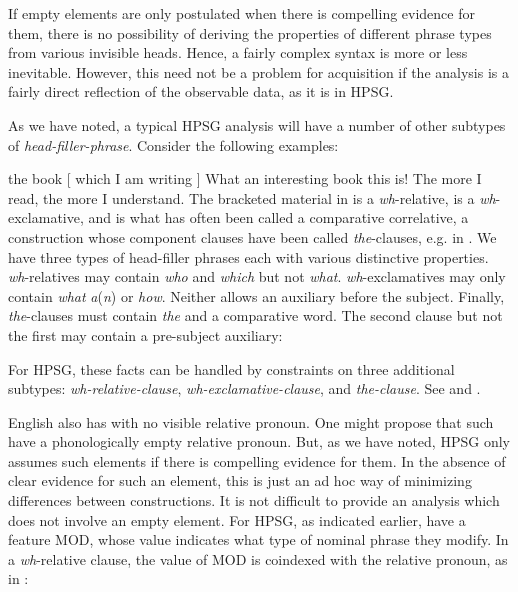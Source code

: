 \documentclass[output=paper]{langsci/langscibook}
\begin{document}
If empty elements are only postulated when there is compelling evidence for
them, there is no possibility of deriving the properties of different phrase
types from various invisible heads. Hence, a fairly complex syntax is more or
less inevitable. However, this need not be a problem for acquisition if the
analysis is a fairly direct reflection of the observable data, as it is in
\gls{HPSG}.

As we have noted, a typical \gls{HPSG} analysis will have a number of other
subtypes of \emph{head-filler-phrase}. Consider the following examples:

\ea\label{ex:key:4.9}
    the book [ which I am writing ]
\z
\ea\label{ex:key:4.10}
    What an interesting book this is!
\z
\ea\label{ex:key:4.11}
    The more I read, the more I understand.
\z
%
The bracketed material in  is a \emph{wh}-relative,
 is a \emph{wh}-exclamative, and  is what has
often been called a comparative correlative, a construction whose component
clauses have been called \emph{the}{}-clauses, e.g. in \citet{Borsley2011}. We
have three types of head-filler phrases each with various distinctive
properties. \emph{wh}-relatives may contain \emph{who} and \emph{which} but not
\emph{what}. \emph{wh}-exclamatives may only contain \emph{what}
\emph{a}(\emph{n}) or \emph{how}. Neither allows an auxiliary before the
subject. Finally, \emph{the}{}-clauses must contain \emph{the} and a
comparative word. The second clause but not the first may contain a pre-subject
auxiliary:

\ea\label{ex:key:4.12}
    \z
\z
%
For \gls{HPSG}, these facts can be handled by constraints on three additional
subtypes: \emph{wh-relative-clause}, \emph{wh-exclamative-clause}, and
\emph{the-clause}. See \citet{GinSag2000} and \citet{Sag2010}.

English also has  with no visible relative pronoun. One might
propose that such  have a phonologically empty relative
pronoun. But, as we have noted, \gls{HPSG} only assumes such elements if there
is compelling evidence for them. In the absence of clear evidence for such an
element, this is just an ad hoc way of minimizing differences between
constructions. It is not difficult to provide an analysis which does not involve
an empty element. For \gls{HPSG}, as indicated earlier,  have a
feature MOD, whose value indicates what type of nominal phrase they modify. In
a \emph{wh}-relative clause, the value of MOD is coindexed with the relative
pronoun, as in :
\end{document}
